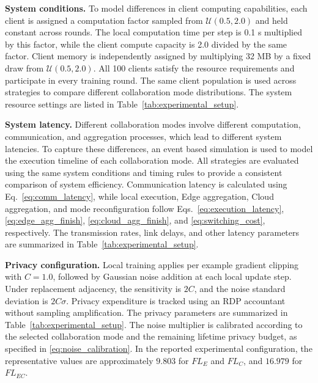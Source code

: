 \documentclass[5p,times]{elsarticle}
\theoremstyle{plain}
\theoremstyle{definition}
\theoremstyle{remark}
\begin{document}
	\textbf{System conditions.}
	To model differences in client computing capabilities,
	each client is assigned a computation factor sampled from
	$\mathcal U(0.5,2.0)$ and held constant across rounds.
	The local computation time per step is 0.1 s multiplied
	by this factor, while the client compute capacity is
	2.0 divided by the same factor.
	Client memory is independently assigned by multiplying
	32 MB by a fixed draw from $\mathcal U(0.5,2.0)$.
	All 100 clients satisfy the resource requirements
	and participate in every training round.
	The same client population is used across strategies
	to compare different collaboration mode distributions.
	The system resource settings are listed in
	Table~\ref{tab:experimental_setup}.
	
	\textbf{System latency.}
	Different collaboration modes involve different
	computation, communication, and aggregation processes,
	which lead to different system latencies.
	To capture these differences, an event based
	simulation is used to model the execution
	timeline of each collaboration mode.
	All strategies are evaluated using the same
	system conditions and timing rules to provide
	a consistent comparison of system efficiency.
	Communication latency is calculated using
	Eq.~\eqref{eq:comm_latency}, while local execution,
	Edge aggregation, Cloud aggregation, and mode
	reconfiguration follow
	Eqs.~\eqref{eq:execution_latency},
	\eqref{eq:edge_agg_finish},
	\eqref{eq:cloud_agg_finish}, and
	\eqref{eq:switching_cost}, respectively.
	The transmission rates, link delays, and
	other latency parameters are summarized in
	Table~\ref{tab:experimental_setup}.
	
	\textbf{Privacy configuration.}
	Local training applies per example gradient clipping
	with $C=1.0$, followed by Gaussian noise addition
	at each local update step.
	Under replacement adjacency, the sensitivity is
	$2C$, and the noise standard deviation is
	$2C\sigma$.
	Privacy expenditure is tracked using an RDP
	accountant without sampling amplification.
	The privacy parameters are summarized in
	Table~\ref{tab:experimental_setup}.
	The noise multiplier is calibrated according
	to the selected collaboration mode and the
	remaining lifetime privacy budget, as specified
	in \eqref{eq:noise_calibration}. In the reported
	experimental configuration, the representative
	values are approximately $9.803$ for $FL_E$
	and $FL_C$, and $16.979$ for $FL_{EC}$.
	
\end{document}
